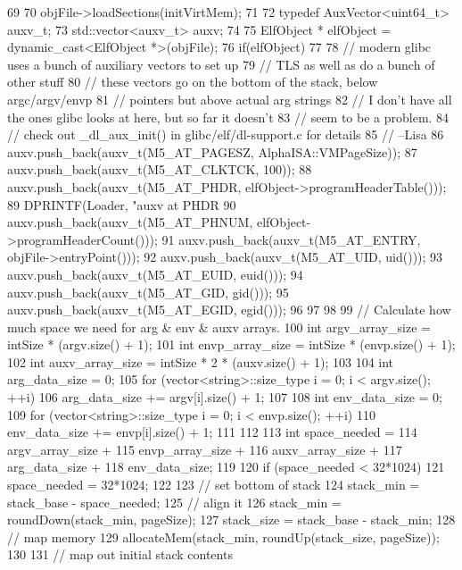 \begin{DoxyCode}
69 {
70     objFile->loadSections(initVirtMem);
71 
72     typedef AuxVector<uint64_t> auxv_t;
73     std::vector<auxv_t>  auxv;
74 
75     ElfObject * elfObject = dynamic_cast<ElfObject *>(objFile);
76     if(elfObject)
77     {
78         // modern glibc uses a bunch of auxiliary vectors to set up 
79         // TLS as well as do a bunch of other stuff
80         // these vectors go on the bottom of the stack, below argc/argv/envp
81         // pointers but above actual arg strings
82         // I don't have all the ones glibc looks at here, but so far it doesn't
83         // seem to be a problem.
84         // check out _dl_aux_init() in glibc/elf/dl-support.c for details
85         // --Lisa
86         auxv.push_back(auxv_t(M5_AT_PAGESZ, AlphaISA::VMPageSize));
87         auxv.push_back(auxv_t(M5_AT_CLKTCK, 100));
88         auxv.push_back(auxv_t(M5_AT_PHDR, elfObject->programHeaderTable()));
89         DPRINTF(Loader, "auxv at PHDR %
90         auxv.push_back(auxv_t(M5_AT_PHNUM, elfObject->programHeaderCount()));
91         auxv.push_back(auxv_t(M5_AT_ENTRY, objFile->entryPoint()));
92         auxv.push_back(auxv_t(M5_AT_UID, uid()));
93         auxv.push_back(auxv_t(M5_AT_EUID, euid()));
94         auxv.push_back(auxv_t(M5_AT_GID, gid()));
95         auxv.push_back(auxv_t(M5_AT_EGID, egid()));
96 
97     }
98 
99     // Calculate how much space we need for arg & env & auxv arrays.
100     int argv_array_size = intSize * (argv.size() + 1);
101     int envp_array_size = intSize * (envp.size() + 1);
102     int auxv_array_size = intSize * 2 * (auxv.size() + 1);
103 
104     int arg_data_size = 0;
105     for (vector<string>::size_type i = 0; i < argv.size(); ++i) {
106         arg_data_size += argv[i].size() + 1;
107     }
108     int env_data_size = 0;
109     for (vector<string>::size_type i = 0; i < envp.size(); ++i) {
110         env_data_size += envp[i].size() + 1;
111     }
112 
113     int space_needed =
114         argv_array_size + 
115         envp_array_size + 
116         auxv_array_size +
117         arg_data_size + 
118         env_data_size;
119 
120     if (space_needed < 32*1024)
121         space_needed = 32*1024;
122 
123     // set bottom of stack
124     stack_min = stack_base - space_needed;
125     // align it
126     stack_min = roundDown(stack_min, pageSize);
127     stack_size = stack_base - stack_min;
128     // map memory
129     allocateMem(stack_min, roundUp(stack_size, pageSize));
130 
131     // map out initial stack contents
}
\end{DoxyCode}
